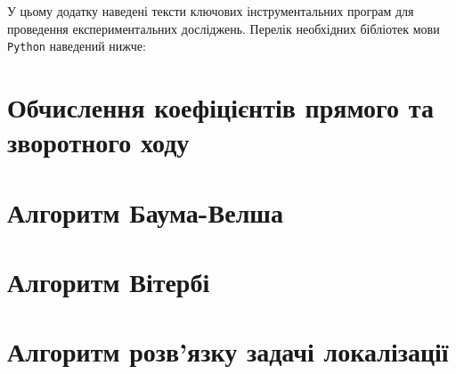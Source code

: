 \label{appendix: B}

У цьому додатку наведені тексти ключових інструментальних програм для проведення експериментальних досліджень. Перелік необхідних бібліотек мови \texttt{Python} наведений нижче:

\vspace{1cm}


\section{Обчислення коефіцієнтів прямого та зворотного ходу}


\vspace{1cm}


\section{Алгоритм Баума-Велша}



\section{Алгоритм Вітербі}



\section{Алгоритм розв'язку задачі локалізації}

